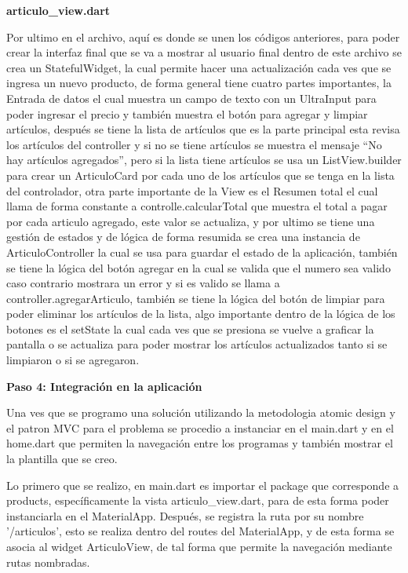 \textbf{articulo\_view.dart}

Por ultimo en el archivo, aquí es donde se unen los códigos anteriores, para poder crear la interfaz final que se va a mostrar al usuario final dentro de este archivo se crea un StatefulWidget, la cual permite hacer una actualización cada ves que se ingresa un nuevo producto, de forma general tiene cuatro partes importantes, la Entrada de datos el cual muestra un campo de texto con un UltraInput para poder ingresar el precio y también muestra el botón para agregar y limpiar artículos, después se tiene la lista de artículos que es la parte principal esta revisa los artículos del controller y si no se tiene artículos se muestra el mensaje “No hay artículos agregados”, pero si la lista tiene artículos se usa un ListView.builder para crear un ArticuloCard por cada uno de los artículos que se tenga en la lista del controlador, otra parte importante de la View es el Resumen total el cual llama de forma constante a controlle.calcularTotal que muestra el total a pagar por cada articulo agregado, este valor se actualiza, y por ultimo se tiene una gestión de estados y de lógica de forma resumida se crea una instancia de ArticuloController la cual se usa para guardar el estado de la aplicación, también se tiene la lógica del botón agregar en la cual se valida que el numero sea valido caso contrario mostrara un error y si es valido se llama a controller.agregarArticulo, también se tiene la lógica del botón de limpiar para poder eliminar los artículos de la lista, algo importante dentro de la lógica de los botones es el setState la cual cada ves que se presiona se vuelve a graficar la pantalla o se actualiza para poder mostrar los artículos actualizados tanto si se limpiaron o si se agregaron.


\textbf{Paso 4: Integración en la aplicación}

Una ves que se programo una solución utilizando la metodologia atomic design y el patron MVC para el problema se procedio a instanciar en el main.dart y en el home.dart que permiten la navegación entre los programas y también mostrar el la plantilla que se creo. 

Lo primero que se realizo, en main.dart es importar el package que corresponde a products, específicamente la vista articulo\_view.dart, para de esta forma poder instanciarla en el MaterialApp. Después, se registra la ruta por su nombre '/articulos', esto se realiza  dentro del routes del MaterialApp, y de esta forma se asocia al widget ArticuloView, de tal forma que permite la navegación mediante rutas nombradas.

